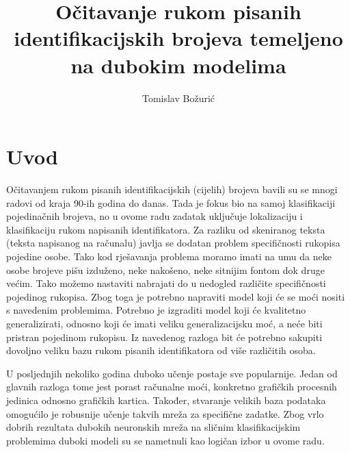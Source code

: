 \documentclass[times, utf8, diplomski]{fer}
\theoremstyle{definition}
\begin{document}

\title{Očitavanje rukom pisanih identifikacijskih brojeva temeljeno
na dubokim modelima}

\author{Tomislav Božurić}
\maketitle

\izvornik


\tableofcontents
\listoffigures


\chapter{Uvod}
Očitavanjem rukom pisanih identifikacijskih (cijelih) brojeva bavili su se mnogi radovi od kraja 90-ih godina do danas. Tada je fokus bio na samoj klasifikaciji pojedinačnih brojeva, no u ovome radu zadatak uključuje lokalizaciju i klasifikaciju rukom napisanih identifikatora. Za razliku od skeniranog teksta (teksta napisanog na računalu) javlja se dodatan problem specifičnosti rukopisa pojedine osobe. Tako kod rješavanja problema moramo imati na umu da neke osobe brojeve pišu izduženo, neke nakošeno, neke sitnijim fontom dok druge većim. Tako možemo nastaviti nabrajati do u nedogled različite specifičnosti pojedinog rukopisa. Zbog toga je potrebno napraviti model koji će se moći nositi s navedenim problemima. Potrebno je izgraditi model koji će kvalitetno generalizirati, odnosno koji će imati veliku generalizacijsku moć, a neće biti pristran pojedinom rukopisu. Iz navedenog razloga bit će potrebno sakupiti dovoljno veliku bazu rukom pisanih identifikatora od više različitih osoba. 

U posljednjih nekoliko godina duboko učenje postaje sve popularnije. Jedan od glavnih razloga tome jest porast računalne moći, konkretno grafičkih procesnih jedinica  odnosno grafičkih kartica. Također, stvaranje velikih baza podataka omogućilo je robusnije  učenje takvih mreža za specifične zadatke. Zbog vrlo dobrih rezultata dubokih neuronskih mreža na sličnim klasifikacijskim problemima duboki modeli su se nametnuli kao logičan izbor u ovome radu.
\end{document}
